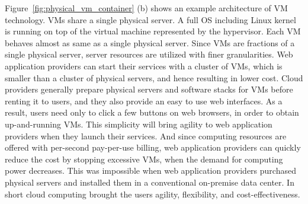 Figure~\ref{fig:physical_vm_container} (b) shows an example architecture of VM technology. 
VMs share a single physical server.
A full OS including Linux kernel is running on top of the virtual machine represented by the hypervisor.
Each VM behaves almost as same as a single physical server.
Since VMs are fractions of a single physical server, server resources are utilized with finer granularities.
Web application providers can start their services with a cluster of VMs, which is smaller than a cluster of physical servers, and hence resulting in lower cost.
Cloud providers generally prepare physical servers and software stacks for VMs before renting it to users, and they also provide an easy to use web interfaces.
As a result, users need only to click a few buttons on web browsers, in order to obtain up-and-running VMs.
This simplicity will bring agility to web application providers when they launch their services.
And since computing resources are offered with per-second pay-per-use billing, web application providers can quickly reduce the cost by stopping excessive VMs, when the demand for computing power decreases.
This was impossible when web application providers purchased physical servers and installed them in a conventional on-premise data center.
In short cloud computing brought the users agility, flexibility, and cost-effectiveness.


